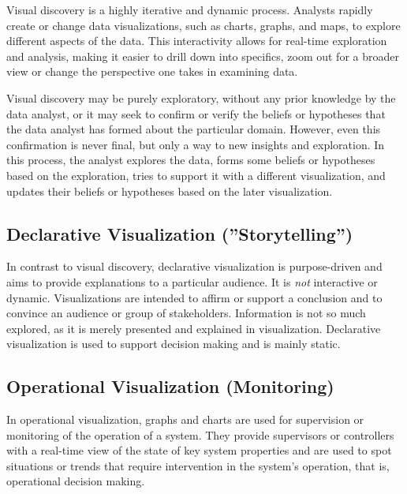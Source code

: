 Visual discovery is a highly iterative and dynamic process. Analysts rapidly create or change data visualizations, such as charts, graphs, and maps, to explore different aspects of the data. This interactivity allows for real-time exploration and analysis, making it easier to drill down into specifics, zoom out for a broader view or change the perspective one takes in examining data.

Visual discovery may be purely exploratory, without any prior knowledge by the data analyst, or it may seek to confirm or verify the beliefs or hypotheses that the data analyst has formed about the particular domain. However, even this confirmation is never final, but only a way to new insights and exploration. In this process, the analyst explores the data, forms some beliefs or hypotheses based on the exploration, tries to support it with a different visualization, and updates their beliefs or hypotheses based on the later visualization.

\subsection*{Declarative Visualization (''Storytelling'')}

In contrast to visual discovery, declarative visualization is purpose-driven and aims to provide explanations to a particular audience. It is \emph{not} interactive or dynamic. Visualizations are intended to affirm or support a conclusion and to convince an audience or group of stakeholders. Information is not so much explored, as it is merely presented and explained in visualization. Declarative visualization is used to support decision making and is mainly static. 

\subsection*{Operational Visualization (Monitoring)}

In operational visualization, graphs and charts are used for supervision or monitoring of the operation of a system. They provide supervisors or controllers with a real-time view of the state of key system properties and are used to spot situations or trends that require intervention in the system's operation, that is, operational decision making. 

